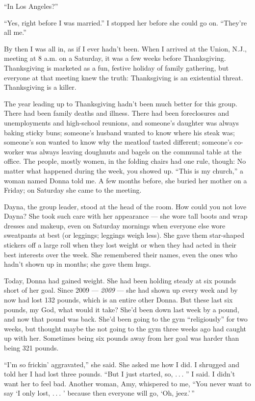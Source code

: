 ``In Los Angeles?''

``Yes, right before I was married.'' I stopped her before she could go
on. ``They're all me.''

By then I was all in, as if I ever hadn't been. When I arrived at the
Union, N.J., meeting at 8 a.m. on a Saturday, it was a few weeks before
Thanksgiving. Thanksgiving is marketed as a fun, festive holiday of
family gathering, but everyone at that meeting knew the truth:
Thanksgiving is an existential threat. Thanksgiving is a killer.

The year leading up to Thanksgiving hadn't been much better for this
group. There had been family deaths and illness. There had been
foreclosures and unemployments and high-school reunions, and someone's
daughter was always baking sticky buns; someone's husband wanted to know
where his steak was; someone's son wanted to know why the meatloaf
tasted different; someone's co-worker was always leaving doughnuts and
bagels on the communal table at the office. The people, mostly women, in
the folding chairs had one rule, though: No matter what happened during
the week, you showed up. ``This is my church,'' a woman named Donna told
me. A few months before, she buried her mother on a Friday; on Saturday
she came to the meeting.

Dayna, the group leader, stood at the head of the room. How could you
not love Dayna? She took such care with her appearance --- she wore tall
boots and wrap dresses and makeup, even on Saturday mornings when
everyone else wore sweatpants at best (or leggings; leggings weigh
less). She gave them star-shaped stickers off a large roll when they
lost weight or when they had acted in their best interests over the
week. She remembered their names, even the ones who hadn't shown up in
months; she gave them hugs.

Today, Donna had gained weight. She had been holding steady at six
pounds short of her goal. Since 2009 --- \emph{2009} --- she had shown
up every week and by now had lost 132 pounds, which is an entire other
Donna. But these last six pounds, my God, what would it take? She'd been
down last week by a pound, and now that pound was back. She'd been going
to the gym ``religiously'' for two weeks, but thought maybe the not
going to the gym three weeks ago had caught up with her. Sometimes being
six pounds away from her goal was harder than being 321 pounds.

``I'm so frickin' aggravated,'' she said. She asked me how I did. I
shrugged and told her I had lost three pounds. ``But I just started, so,
. . . '' I said. I didn't want her to feel bad. Another woman, Amy,
whispered to me, ``You never want to say `I only lost, . . . ' because
then everyone will go, `Oh, jeez.' ''

